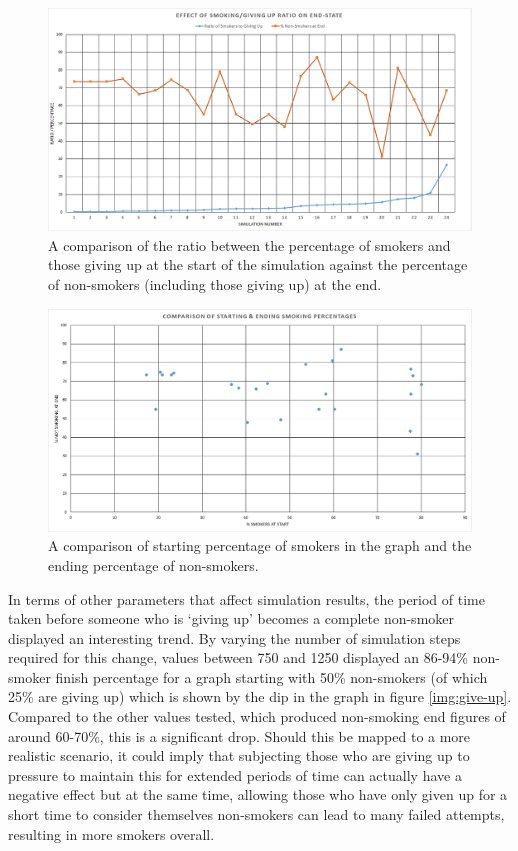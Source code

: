 \documentclass[]{report}
\begin{document}
\begin{figure}
\begin{center}
\includegraphics[width=\textwidth]{smok-giveup.png}
\end{center}
\caption{A comparison of the ratio between the percentage of smokers and those giving up at the start of the simulation against the percentage of non-smokers (including those giving up) at the end.}
\label{img:smok-give}
\end{figure}

\begin{figure}
\begin{center}
\includegraphics[width=\textwidth]{smok-pct.png}
\end{center}
\caption{A comparison of starting percentage of smokers in the graph and the ending percentage of non-smokers.}
\label{img:smok-pct}
\end{figure}

In terms of other parameters that affect simulation results, the period of time taken before someone who is `giving up' becomes a complete non-smoker displayed an interesting trend. By varying the number of simulation steps required for this change, values between 750 and 1250 displayed an 86-94\% non-smoker finish percentage for a graph starting with 50\% non-smokers (of which 25\% are giving up) which is shown by the dip in the graph in figure \ref{img:give-up}. Compared to the other values tested, which produced non-smoking end figures of around 60-70\%, this is a significant drop. Should this be mapped to a more realistic scenario, it could imply that subjecting those who are giving up to pressure to maintain this for extended periods of time can actually have a negative effect but at the same time, allowing those who have only given up for a short time to consider themselves non-smokers can lead to many failed attempts, resulting in more smokers overall.
\end{document}
